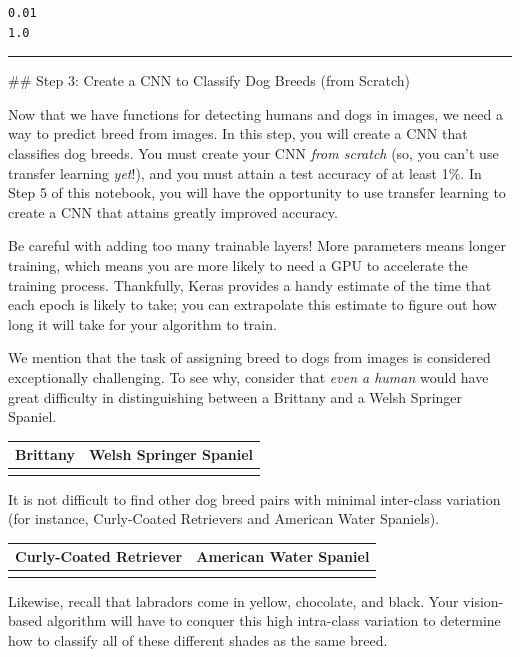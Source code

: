 \documentclass[11pt]{article}
\begin{document}
    \begin{Verbatim}[commandchars=\\\{\}]
0.01
1.0

    \end{Verbatim}

    \begin{center}\rule{0.5\linewidth}{\linethickness}\end{center}

 \#\# Step 3: Create a CNN to Classify Dog Breeds (from Scratch)

Now that we have functions for detecting humans and dogs in images, we
need a way to predict breed from images. In this step, you will create a
CNN that classifies dog breeds. You must create your CNN \emph{from
scratch} (so, you can't use transfer learning \emph{yet}!), and you must
attain a test accuracy of at least 1\%. In Step 5 of this notebook, you
will have the opportunity to use transfer learning to create a CNN that
attains greatly improved accuracy.

Be careful with adding too many trainable layers! More parameters means
longer training, which means you are more likely to need a GPU to
accelerate the training process. Thankfully, Keras provides a handy
estimate of the time that each epoch is likely to take; you can
extrapolate this estimate to figure out how long it will take for your
algorithm to train.

We mention that the task of assigning breed to dogs from images is
considered exceptionally challenging. To see why, consider that
\emph{even a human} would have great difficulty in distinguishing
between a Brittany and a Welsh Springer Spaniel.

\begin{longtable}[]{@{}ll@{}}
\toprule
Brittany & Welsh Springer Spaniel\tabularnewline
\midrule
\endhead
&\tabularnewline
\bottomrule
\end{longtable}

It is not difficult to find other dog breed pairs with minimal
inter-class variation (for instance, Curly-Coated Retrievers and
American Water Spaniels).

\begin{longtable}[]{@{}ll@{}}
\toprule
Curly-Coated Retriever & American Water Spaniel\tabularnewline
\midrule
\endhead
&\tabularnewline
\bottomrule
\end{longtable}

Likewise, recall that labradors come in yellow, chocolate, and black.
Your vision-based algorithm will have to conquer this high intra-class
variation to determine how to classify all of these different shades as
the same breed.
\end{document}
